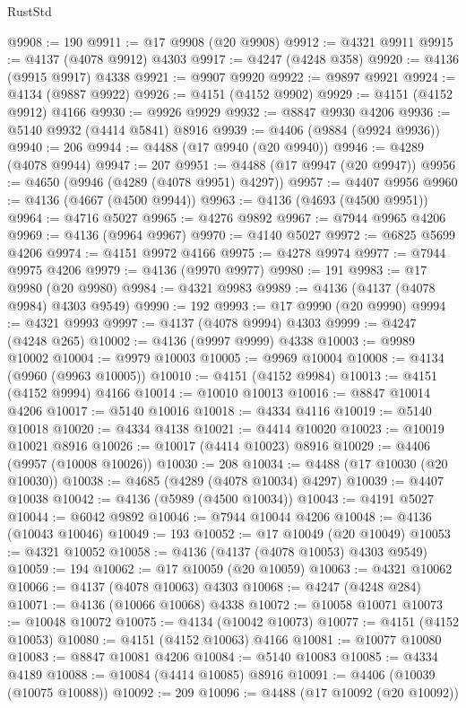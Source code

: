 \begin{lexlean}{RustStd}
\begin{coremodule}
{\begin{coremodule}
{{{{{{{{{{{{{{{{{{{{{{{{{{{{{{{{{{{{{{{{{{{{{{{{{{@9908 := 190
@9911 := @17 @9908 (@20 @9908)
@9912 := @4321 @9911
@9915 := @4137 (@4078 @9912) @4303
@9917 := @4247 (@4248 @358)
@9920 := @4136 (@9915 @9917) @4338
@9921 := @9907 @9920
@9922 := @9897 @9921
@9924 := @4134 (@9887 @9922)
@9926 := @4151 (@4152 @9902)
@9929 := @4151 (@4152 @9912) @4166
@9930 := @9926 @9929
@9932 := @8847 @9930 @4206
@9936 := @5140 @9932 (@4414 @5841) @8916
@9939 := @4406 (@9884 (@9924 @9936))
@9940 := 206
@9944 := @4488 (@17 @9940 (@20 @9940))
@9946 := @4289 (@4078 @9944)
@9947 := 207
@9951 := @4488 (@17 @9947 (@20 @9947))
@9956 := @4650 (@9946 (@4289 (@4078 @9951) @4297))
@9957 := @4407 @9956
@9960 := @4136 (@4667 (@4500 @9944))
@9963 := @4136 (@4693 (@4500 @9951))
@9964 := @4716 @5027
@9965 := @4276 @9892
@9967 := @7944 @9965 @4206
@9969 := @4136 (@9964 @9967)
@9970 := @4140 @5027
@9972 := @6825 @5699 @4206
@9974 := @4151 @9972 @4166
@9975 := @4278 @9974
@9977 := @7944 @9975 @4206
@9979 := @4136 (@9970 @9977)
@9980 := 191
@9983 := @17 @9980 (@20 @9980)
@9984 := @4321 @9983
@9989 := @4136 (@4137 (@4078 @9984) @4303 @9549)
@9990 := 192
@9993 := @17 @9990 (@20 @9990)
@9994 := @4321 @9993
@9997 := @4137 (@4078 @9994) @4303
@9999 := @4247 (@4248 @265)
@10002 := @4136 (@9997 @9999) @4338
@10003 := @9989 @10002
@10004 := @9979 @10003
@10005 := @9969 @10004
@10008 := @4134 (@9960 (@9963 @10005))
@10010 := @4151 (@4152 @9984)
@10013 := @4151 (@4152 @9994) @4166
@10014 := @10010 @10013
@10016 := @8847 @10014 @4206
@10017 := @5140 @10016
@10018 := @4334 @4116
@10019 := @5140 @10018
@10020 := @4334 @4138
@10021 := @4414 @10020
@10023 := @10019 @10021 @8916
@10026 := @10017 (@4414 @10023) @8916
@10029 := @4406 (@9957 (@10008 @10026))
@10030 := 208
@10034 := @4488 (@17 @10030 (@20 @10030))
@10038 := @4685 (@4289 (@4078 @10034) @4297)
@10039 := @4407 @10038
@10042 := @4136 (@5989 (@4500 @10034))
@10043 := @4191 @5027
@10044 := @6042 @9892
@10046 := @7944 @10044 @4206
@10048 := @4136 (@10043 @10046)
@10049 := 193
@10052 := @17 @10049 (@20 @10049)
@10053 := @4321 @10052
@10058 := @4136 (@4137 (@4078 @10053) @4303 @9549)
@10059 := 194
@10062 := @17 @10059 (@20 @10059)
@10063 := @4321 @10062
@10066 := @4137 (@4078 @10063) @4303
@10068 := @4247 (@4248 @284)
@10071 := @4136 (@10066 @10068) @4338
@10072 := @10058 @10071
@10073 := @10048 @10072
@10075 := @4134 (@10042 @10073)
@10077 := @4151 (@4152 @10053)
@10080 := @4151 (@4152 @10063) @4166
@10081 := @10077 @10080
@10083 := @8847 @10081 @4206
@10084 := @5140 @10083
@10085 := @4334 @4189
@10088 := @10084 (@4414 @10085) @8916
@10091 := @4406 (@10039 (@10075 @10088))
@10092 := 209
@10096 := @4488 (@17 @10092 (@20 @10092))
}}}}}}}}}}}}}}}}}}}}}}}}}}}}}}}}}}}}}}}}}}}}}}}}}}
\end{coremodule}}
\end{coremodule}
\end{lexlean}

